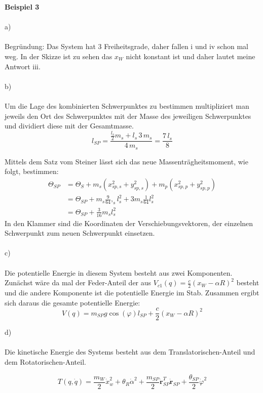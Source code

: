 \newpage
\noindent
\textbf{Beispiel 3} \\ \\
a) \\ \\
\noindent
Begründung: Das System hat 3 Freiheitsgrade, daher fallen i und iv schon mal weg. In der Skizze ist zu sehen das \(x_W\) nicht konstant ist und daher lautet meine Antwort iii. \\ \\ b) \\ \\ \noindent
Um die Lage des kombinierten Schwerpunktes zu bestimmen multipliziert man jeweils den Ort des Schwerpunktes mit der Masse des jeweiligen Schwerpunktes und dividiert diese mit der Gesamtmasse.
\[l_{SP} = \frac{\frac{l_s}{2}m_s+l_s\,3\,m_s}{4\,m_s} = \frac{7\,l_s}{8}\]

\noindent
Mittels dem Satz vom Steiner lässt sich das neue Massenträgheitsmoment, wie folgt, bestimmen:
\begin{align*}
	\varTheta_{SP} &= \varTheta_S + m_s\left(x^2_{sp,s} + y^2_{sp,s}\right) + m_p\left(x^2_{sp,p} + y^2_{sp,p}\right) \\
	&= \varTheta_{SP} + m_s\frac{9}{64},_sl_s^2 + 3m_s\frac{1}{64}l_s^2 \\
	&= \varTheta_{SP} + \frac{3}{16}m_sl_s^2
\end{align*}
In den Klammer sind die Koordinaten der Verschiebungsvektoren, der einzelnen Schwerpunkt zum neuen Schwerpunkt einsetzen. \\ \\
c) \\\\
\noindent
Die potentielle Energie in diesem System besteht aus zwei Komponenten. Zunächst wäre da mal der Feder-Anteil der aus \(V_{c1}(q) = \frac{c}{2}(x_W - \alpha R)^2 \) besteht und die andere Komponente ist die potentielle Energie im Stab. Zusammen ergibt sich daraus die gesamte potentielle Energie: \[V(q) = m_{SP} g \cos{(\varphi)} l_{SP} + \frac{c}{2} (x_W - \alpha R)^2\]

\noindent d) \\\\

\noindent
Die kinetische Energie des Systems besteht aus dem Translatorischen-Anteil und dem Rotatorischen-Anteil.

\[T(q,\dot{q}) = \frac{m_W}{2} \dot{x}_w^2 + \theta_R \dot{\alpha}^2 + \frac{m_{SP}}{2} \dot{\textbf{r}}_{SP}^T\dot{\textbf{r}}_{SP} + \frac{\theta_{SP}}{2}\dot{\varphi}^2 \]

